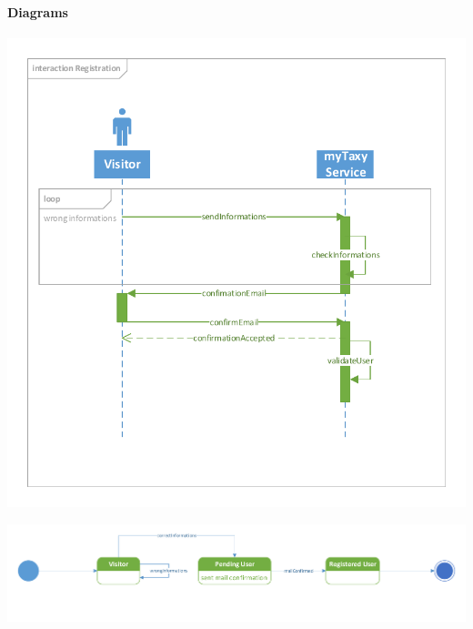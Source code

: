 \paragraph{Diagrams}
	\begin{center}
		\includegraphics[width=\textwidth]{diagrams/registration}
	\end{center}
	\begin{center}
		\includegraphics[width=\textwidth]{diagrams/registration_state}
	\end{center}


